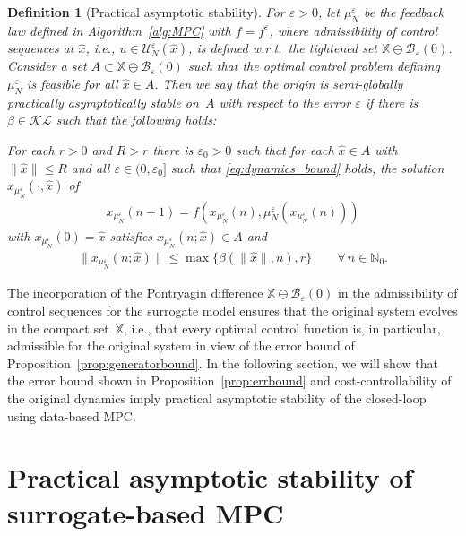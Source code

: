 \documentclass{article}
\numberwithin{equation}{section}
\newtheorem{definition}[theorem]{Definition}
\newcommand{\calU}{\mathcal U}
\newcommand{\bX}{\mathbb X}
\begin{document}
	\begin{definition}[Practical asymptotic stability]\label{def:pracstab}
		For $\varepsilon>0$, let $\mu_N^\varepsilon$ be the feedback law defined in Algorithm~\ref{alg:MPC} with $f=f^\varepsilon$, where admissibility of control sequences at $\hat{x}$, i.e., $u \in \calU_N^\varepsilon(\hat{x})$, is defined w.r.t.\ the tightened set $\bX \ominus \mathcal{B}_\varepsilon(0)$. Consider a set $A \subset \mathbb{X} \ominus \mathcal{B}_\varepsilon(0)$ such that the optimal control problem defining $\mu_N^\varepsilon$ is feasible for all $\hat{x} \in A$. 
		Then we say that the origin is semi-globally practically asymptotically stable on~$A$ with respect to the error $\varepsilon$ if there is $\beta \in \mathcal{K}\mathcal{L}$ such that the following holds:
		
		For each $r>0$ and $R > r$ there is $ \varepsilon_0 > 0$ such that for each $\hat{x} \in A$ with $\| \hat{x} \|\leq R$ and all $\varepsilon \in (0,\varepsilon_0]$ such that \eqref{eq:dynamics_bound} holds, the solution $x_{\mu_N^\varepsilon}(\cdot,\hat{x})$ of 
		\begin{align}\label{eq:ex_cl}
		x_{\mu_N^\varepsilon} (n+1) = f(x_{\mu_N^\varepsilon}(n),\mu_N^\varepsilon(x_{\mu_N^\varepsilon}(n)))
		\end{align}
		with $x_{\mu_N^\varepsilon}(0) = \hat{x}$ satisfies $x_{\mu_N^\varepsilon}(n;\hat{x})\in A$ and 
		\begin{align*}
		\| x_{\mu_N^\varepsilon}(n;\hat{x}) \| \leq \max \{\beta(\| \hat{x} \|,n),r\} \qquad\forall\,n \in \mathbb{N}_0.
		\end{align*}
	\end{definition}
	\noindent The incorporation of the Pontryagin difference $\mathbb{X} \ominus \mathcal{B}_\varepsilon(0)$ in the admissibility of control sequences for the surrogate model ensures that the original system evolves in the compact set~$\bX$, i.e., that every optimal control function is, in particular, admissible for the original system in view of the error bound of Proposition~\ref{prop:generatorbound}.
	In the following section, we will show that the error bound shown in Proposition~\ref{prop:errbound} and cost-controllability of the original dynamics imply practical asymptotic stability of the closed-loop using data-based MPC.
	
	
	
	
	\section{Practical asymptotic stability of surrogate-based MPC}
	\label{sec:PAS}
	
\end{document}
